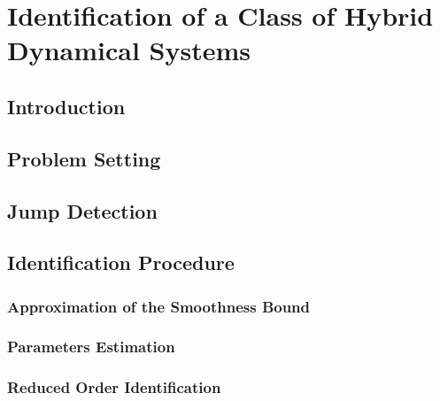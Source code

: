 
\chapter{Identification of a Class of Hybrid Dynamical Systems}

\label{chap:glassclassification}
\minitoc

\thispagestyle{empty}

\newpage

\section{Introduction}

\clearpage

\section{Problem Setting}\label{ProblemS}

\clearpage

\section{Jump Detection}\label{JumpD}

\clearpage

\section{Identification Procedure}\label{Identification}
\subsection{Approximation of the Smoothness Bound}
\subsection{Parameters Estimation}
\subsection{Reduced Order Identification}
